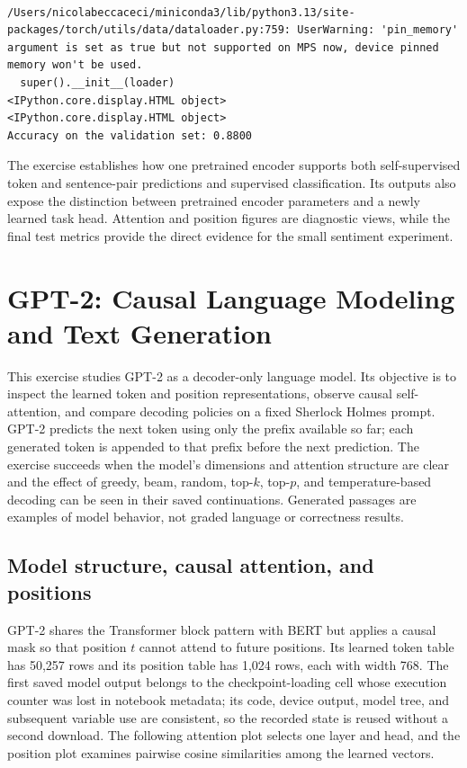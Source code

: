 \documentclass[../labs.tex]{subfiles}
\begin{document}
\hypertarget{out:lab03-bert-c34}{}\label{out:lab03-bert-c34}

\begin{lstlisting}[style=terminalOutput,breakatwhitespace=false,columns=fullflexible]

/Users/nicolabeccaceci/miniconda3/lib/python3.13/site-packages/torch/utils/data/dataloader.py:759: UserWarning: 'pin_memory' argument is set as true but not supported on MPS now, device pinned memory won't be used.
  super().__init__(loader)
<IPython.core.display.HTML object>
<IPython.core.display.HTML object>
Accuracy on the validation set: 0.8800

\end{lstlisting}

The exercise establishes how one pretrained encoder supports both self-supervised token and sentence-pair predictions and supervised classification. Its outputs also expose the distinction between pretrained encoder parameters and a newly learned task head. Attention and position figures are diagnostic views, while the final test metrics provide the direct evidence for the small sentiment experiment.

\chapter{GPT-2: Causal Language Modeling and Text Generation}
\label{ch:lab03-gpt2}

This exercise studies GPT-2 as a decoder-only language model. Its objective is to inspect the learned token and position representations, observe causal self-attention, and compare decoding policies on a fixed Sherlock Holmes prompt. GPT-2 predicts the next token using only the prefix available so far; each generated token is appended to that prefix before the next prediction. The exercise succeeds when the model’s dimensions and attention structure are clear and the effect of greedy, beam, random, top-$k$, top-$p$, and temperature-based decoding can be seen in their saved continuations. Generated passages are examples of model behavior, not graded language or correctness results.

\section{Model structure, causal attention, and positions}

GPT-2 shares the Transformer block pattern with BERT but applies a causal mask so that position $t$ cannot attend to future positions. Its learned token table has 50,257 rows and its position table has 1,024 rows, each with width 768. The first saved model output belongs to the checkpoint-loading cell whose execution counter was lost in notebook metadata; its code, device output, model tree, and subsequent variable use are consistent, so the recorded state is reused without a second download. The following attention plot selects one layer and head, and the position plot examines pairwise cosine similarities among the learned vectors.
\end{document}
